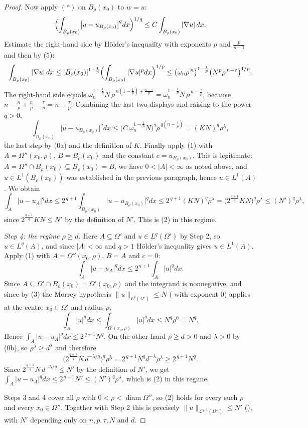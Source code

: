 \begin{proof}
Now apply $(*)$ on $B_\rho(x_0)$ to $w=u$:
\[
\Bigl(\int_{B_\rho(x_0)}\bigl|u-u_{B_\rho(x_0)}\bigr|^{q}dx\Bigr)^{1/q}
\le C\int_{B_\rho(x_0)}|\nabla u|\,dx .
\]
Estimate the right-hand side by H\"older's inequality with exponents $p$ and
$\frac p{p-1}$ and then by (5):
\[
\int_{B_\rho(x_0)}|\nabla u|\,dx
\le|B_\rho(x_0)|^{1-\frac1p}\Bigl(\int_{B_\rho(x_0)}|\nabla u|^{p}dx\Bigr)^{1/p}
\le\bigl(\omega_n\rho^{\,n}\bigr)^{1-\frac1p}\bigl(N^{p}\rho^{\,n-\tau}\bigr)^{1/p} .
\]
The right-hand side equals
$\omega_n^{1-\frac1p}N\,\rho^{\,n(1-\frac1p)+\frac{n-\tau}p}
=\omega_n^{1-\frac1p}N\,\rho^{\,n-\frac\tau p}$, because
$n-\frac np+\frac np-\frac\tau p=n-\frac\tau p$.  Combining the last two
displays and raising to the power $q>0$,
\[
\int_{B_\rho(x_0)}\bigl|u-u_{B_\rho(x_0)}\bigr|^{q}dx
\le\bigl(C\,\omega_n^{1-\frac1p}N\bigr)^{q}\rho^{\,q(n-\frac\tau p)}
=(KN)^{q}\rho^{\lambda},
\]
the last step by (0a) and the definition of $K$.  Finally apply (1) with
$A=\Omega''(x_0,\rho)$, $B=B_\rho(x_0)$ and the constant
$c=u_{B_\rho(x_0)}$.  This is legitimate: $A=\Omega''\cap B_\rho(x_0)\subseteq
B_\rho(x_0)=B$, we have $0<|A|<\infty$ as noted above, and
$u\in L^{1}(B_\rho(x_0))$ was established in the previous paragraph, hence
$u\in L^1(A)$.  We obtain
\[
\int_A|u-u_A|^{q}dx
\le2^{\,q+1}\int_{B_\rho(x_0)}\bigl|u-u_{B_\rho(x_0)}\bigr|^{q}dx
\le2^{\,q+1}(KN)^{q}\rho^{\lambda}
=\bigl(2^{\frac{q+1}q}KN\bigr)^{q}\rho^{\lambda}
\le(N')^{q}\rho^{\lambda},
\]
since $2^{\frac{q+1}q}KN\le N'$ by the definition of $N'$.  This is (2) in this
regime.

\emph{Step 4: the regime $\rho\ge d$.}  Here $A\subseteq\Omega'$ and
$u\in L^{q}(\Omega')$ by Step 2, so $u\in L^{q}(A)$, and since $|A|<\infty$ and
$q>1$ H\"older's inequality gives $u\in L^{1}(A)$.  Apply (1) with
$A=\Omega''(x_0,\rho)$, $B=A$ and $c=0$:
\[
\int_A|u-u_A|^{q}dx\le2^{\,q+1}\int_A|u|^{q}dx .
\]
Since $A\subseteq\Omega'\cap B_\rho(x_0)=\Omega'(x_0,\rho)$ and the integrand is
nonnegative, and since by (3) the Morrey hypothesis
$\|u\|_{L^{q}(\Omega')}\le N$ ( with exponent $0$) applies
at the centre $x_0\in\Omega'$ and radius $\rho$,
\[
\int_A|u|^{q}dx\le\int_{\Omega'(x_0,\rho)}|u|^{q}dx\le N^{q}\rho^{0}=N^{q}.
\]
Hence $\int_A|u-u_A|^{q}dx\le2^{\,q+1}N^{q}$.  On the other hand $\rho\ge d>0$
and $\lambda>0$ by (0b), so $\rho^{\lambda}\ge d^{\lambda}$ and therefore
\[
\bigl(2^{\frac{q+1}q}N\,d^{-\lambda/q}\bigr)^{q}\rho^{\lambda}
=2^{\,q+1}N^{q}d^{-\lambda}\rho^{\lambda}
\ge2^{\,q+1}N^{q}.
\]
Since $2^{\frac{q+1}q}N\,d^{-\lambda/q}\le N'$ by the definition of $N'$, we get
$\int_A|u-u_A|^{q}dx\le2^{\,q+1}N^{q}\le(N')^{q}\rho^{\lambda}$, which is (2) in
this regime.

Steps 3 and 4 cover all $\rho$ with $0<\rho<\operatorname{diam}\Omega''$, so (2)
holds for every such $\rho$ and every $x_0\in\Omega''$.  Together with Step 2
this is precisely $\|u\|_{\mathcal L^{q,\lambda}(\Omega'')}\le N'$
(), with $N'$ depending only on $n,p,\tau,N$ and $d$.
\end{proof}

